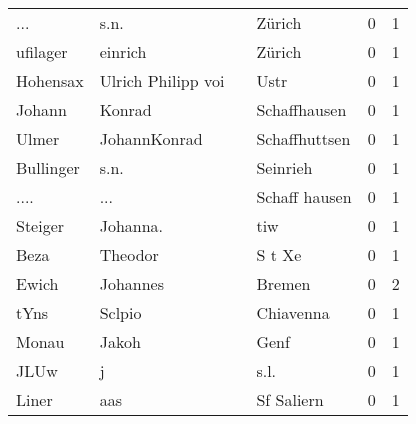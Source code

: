 \begin{center}
\begin{tiny}
\begin{longtabu}{llllrr}
                      ... &                               s.n. &             &                                      Zürich &          0 &         1 \\
                 ufilager &                            einrich &             &                                      Zürich &          0 &         1 \\
                 Hohensax &                 Ulrich Philipp voi &             &                                        Ustr &          0 &         1 \\
                   Johann &                             Konrad &             &                                Schaffhausen &          0 &         1 \\
                    Ulmer &                       JohannKonrad &             &                               Schaffhuttsen &          0 &         1 \\
                Bullinger &                               s.n. &             &                                    Seinrieh &          0 &         1 \\
                     .... &                                ... &             &                               Schaff hausen &          0 &         1 \\
                  Steiger &                           Johanna. &             &                                         tiw &          0 &         1 \\
                     Beza &                            Theodor &             &                                      S t Xe &          0 &         1 \\
                    Ewich &                           Johannes &             &                                      Bremen &          0 &         2 \\
                     tYns &                             Sclpio &             &                                   Chiavenna &          0 &         1 \\
                    Monau &                              Jakoh &             &                                        Genf &          0 &         1 \\
                     JLUw &                                  j &             &                                        s.l. &          0 &         1 \\
                    Liner &                                aas &             &                                  Sf Saliern &          0 &         1 \\

\end{longtabu}
\end{tiny}
\end{center}
